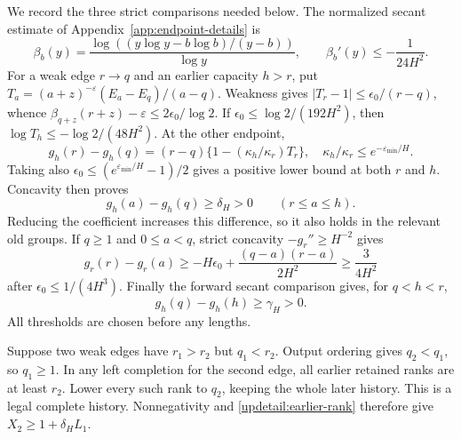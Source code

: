 We record the three strict comparisons needed below. The normalized
secant estimate of Appendix~\ref{app:endpoint-details} is
\[
 \beta_b(y)=\frac{\log((y\log y-b\log b)/(y-b))}{\log y},
 \qquad \beta_b'(y)\leq-\frac1{24H^2}.
\]
For a weak edge $r\to q$ and an earlier capacity $h>r$, put
$T_a=(a+z)^{-\varepsilon}(E_a-E_q)/(a-q)$. Weakness gives
$|T_r-1|\leq\epsilon_0/(r-q)$, whence
$\beta_{q+z}(r+z)-\varepsilon\leq2\epsilon_0/\log2$.
If $\epsilon_0\leq\log2/(192H^2)$, then
$\log T_h\leq-\log2/(48H^2)$. At the other endpoint,
\[
 g_h(r)-g_h(q)
 =(r-q)\{1-(\kappa_h/\kappa_r)T_r\},
 \quad \kappa_h/\kappa_r\leq e^{-\varepsilon_{\min}/H}.
\]
Taking also
$\epsilon_0\leq(e^{\varepsilon_{\min}/H}-1)/2$ gives a positive
lower bound at both $r$ and $h$. Concavity then proves
\begin{equation}
 g_h(a)-g_h(q)\geq\delta_H>0\qquad(r\leq a\leq h).
 \label{updetail:earlier-rank}
\end{equation}
Reducing the coefficient increases this difference, so it also holds
in the relevant old groups. If $q\geq1$ and $0\leq a<q$, strict
concavity $-g_r''\geq H^{-2}$ gives
\[
 g_r(r)-g_r(a)\geq-H\epsilon_0+
                \frac{(q-a)(r-a)}{2H^2}
 \geq\frac3{4H^2}
\]
after $\epsilon_0\leq1/(4H^3)$. Finally the forward secant comparison
gives, for $q<h<r$,
\begin{equation}
 g_h(q)-g_h(h)\geq\gamma_H>0.
 \label{updetail:intervening-rank}
\end{equation}
All thresholds are chosen before any lengths.

Suppose two weak edges have $r_1>r_2$ but $q_1<r_2$. Output ordering
gives $q_2<q_1$, so $q_1\geq1$. In any left completion for the second
edge, all earlier retained ranks are at least $r_2$. Lower every such
rank to $q_2$, keeping the whole later history. This is a legal
complete history. Nonnegativity and \eqref{updetail:earlier-rank}
therefore give $X_2\geq1+\delta_HL_1$.

